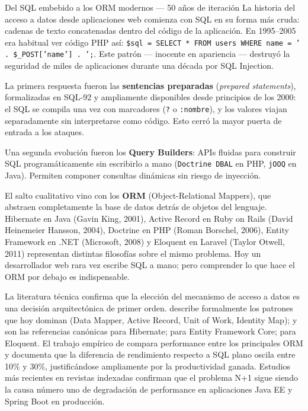 \documentclass[11pt,a4paper,openany]{book}
\begin{document}
\begin{cajahistoria}{Del SQL embebido a los ORM modernos --- 50 años de iteración}
La historia del acceso a datos desde aplicaciones web comienza con SQL
en su forma más cruda: cadenas de texto concatenadas dentro del código
de la aplicación. En 1995--2005 era habitual ver código PHP así:
\texttt{\$sql =  SELECT * FROM users WHERE name = ' . \$\_POST['name'] .  ';}.
Este patrón --- inocente en apariencia --- destruyó la seguridad de
miles de aplicaciones durante una década por SQL Injection.

La primera respuesta fueron las \textbf{sentencias preparadas}
(\emph{prepared statements}), formalizadas en SQL-92 y ampliamente
disponibles desde principios de los 2000: el SQL se compila una vez
con marcadores (\texttt{?} o \texttt{:nombre}), y los valores viajan
separadamente sin interpretarse como código. Esto cerró la mayor
puerta de entrada a los ataques.

Una segunda evolución fueron los \textbf{Query Builders}: APIs
fluidas para construir SQL programáticamente sin escribirlo a mano
(\texttt{Doctrine DBAL} en PHP, \texttt{jOOQ} en Java). Permiten
componer consultas dinámicas sin riesgo de inyección.

El salto cualitativo vino con los \textbf{ORM} (Object-Relational
Mappers), que abstraen completamente la base de datos detrás de
objetos del lenguaje. Hibernate en Java (Gavin King, 2001), Active
Record en Ruby on Rails (David Heinemeier Hansson, 2004), Doctrine en
PHP (Roman Borschel, 2006), Entity Framework en .NET (Microsoft, 2008)
y Eloquent en Laravel (Taylor Otwell, 2011) representan distintas
filosofías sobre el mismo problema. Hoy un desarrollador web rara vez
escribe SQL a mano; pero comprender lo que hace el ORM por debajo es
indispensable.

La literatura técnica confirma que la elección del mecanismo de
acceso a datos es una decisión arquitectónica de primer orden.
\cite{fowler2002patterns} describe formalmente los patrones que hoy
dominan (Data Mapper, Active Record, Unit of Work, Identity Map);
\cite{ottinger2017hibernate} y \cite{bauer2015java} son las
referencias canónicas para Hibernate; \cite{smith2018entity} para
Entity Framework Core; \cite{otwell2024laravel} para Eloquent. El
trabajo empírico de \cite{salah2017orm} compara performance entre
los principales ORM y documenta que la diferencia de rendimiento
respecto a SQL plano oscila entre 10\% y 30\%, justificándose
ampliamente por la productividad ganada. Estudios más recientes
\cite{ottinger2017hibernate} en revistas indexadas confirman que el problema
N+1 sigue siendo la causa número uno de degradación de performance
en aplicaciones Java EE y Spring Boot en producción.
\end{cajahistoria}
\end{document}
